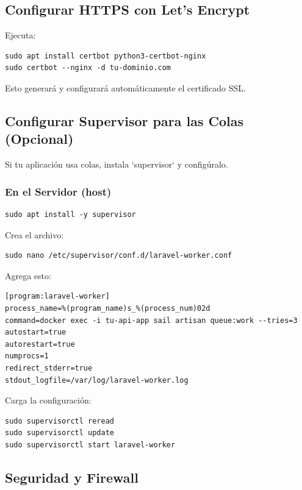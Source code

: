 \documentclass[11pt]{article}
\begin{document}
\subsection{Configurar HTTPS con Let's Encrypt}
\label{sec:orge04e614}

Ejecuta:

\begin{verbatim}
sudo apt install certbot python3-certbot-nginx
sudo certbot --nginx -d tu-dominio.com
\end{verbatim}

Esto generará y configurará automáticamente el certificado SSL.

\subsection{Configurar Supervisor para las Colas (Opcional)}
\label{sec:org6c48a73}

Si tu aplicación usa colas, instala `supervisor` y configúralo.

\subsubsection*{En el Servidor (host)}
\label{sec:orgaf8c1d4}
\begin{verbatim}
sudo apt install -y supervisor
\end{verbatim}

Crea el archivo:

\begin{verbatim}
sudo nano /etc/supervisor/conf.d/laravel-worker.conf
\end{verbatim}

Agrega esto:

\begin{verbatim}
[program:laravel-worker]
process_name=%(program_name)s_%(process_num)02d
command=docker exec -i tu-api-app sail artisan queue:work --tries=3
autostart=true
autorestart=true
numprocs=1
redirect_stderr=true
stdout_logfile=/var/log/laravel-worker.log
\end{verbatim}

Carga la configuración:

\begin{verbatim}
sudo supervisorctl reread
sudo supervisorctl update
sudo supervisorctl start laravel-worker
\end{verbatim}

\subsection{Seguridad y Firewall}
\label{sec:org1821faa}
\end{document}
